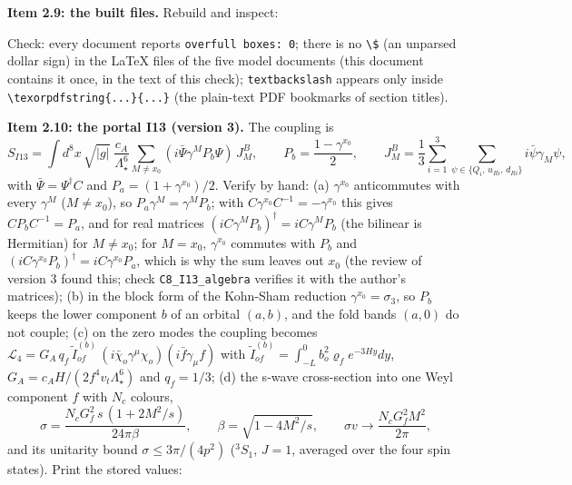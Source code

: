 \documentclass[
  10pt,
]{article}
\newenvironment{Shaded}{}{}
\newcommand{\NormalTok}[1]{#1}
\begin{document}
\textbf{Item 2.9: the built files.} Rebuild and inspect:

\begin{Shaded}
\end{Shaded}

Check: every document reports \texttt{overfull\ boxes:\ 0}; there is no
\texttt{\textbackslash{}\$} (an unparsed dollar sign) in the LaTeX files
of the five model documents (this document contains it once, in the text
of this check); \texttt{textbackslash} appears only inside
\texttt{\textbackslash{}texorpdfstring\{...\}\{...\}} (the plain-text
PDF bookmarks of section titles).

\textbf{Item 2.10: the portal I13 (version 3).} The coupling is
\[ S_{I13} = \int d^8x\,\sqrt{|g|}\;\frac{c_A}{\Lambda_\star^6}\sum_{M \ne x_0}(i\bar\Psi\gamma^MP_b\Psi)\,J^B_M,\qquad P_b = \frac{1 - \gamma^{x_0}}{2},\qquad
   J^B_M = \frac13\sum_{i=1}^{3}\sum_{\psi\in\{Q_i,\,u_{Ri},\,d_{Ri}\}}i\bar\psi\gamma_M\psi, \]
with \(\bar\Psi = \Psi^\dagger C\) and \(P_a = (1 + \gamma^{x_0})/2\).
Verify by hand: (a) \(\gamma^{x_0}\) anticommutes with every
\(\gamma^M\) (\(M \ne x_0\)), so \(P_a\gamma^M = \gamma^MP_b\); with
\(C\gamma^{x_0}C^{-1} = -\gamma^{x_0}\) this gives \(CP_bC^{-1} = P_a\),
and for real matrices \((iC\gamma^MP_b)^\dagger = iC\gamma^MP_b\) (the
bilinear is Hermitian) for \(M \ne x_0\); for \(M = x_0\),
\(\gamma^{x_0}\) commutes with \(P_b\) and
\((iC\gamma^{x_0}P_b)^\dagger = iC\gamma^{x_0}P_a\), which is why the
sum leaves out \(x_0\) (the review of version 3 found this; check
\texttt{C8\_I13\_algebra} verifies it with the author's matrices); (b)
in the block form of the Kohn-Sham reduction
\(\gamma^{x_0} = \sigma_3\), so \(P_b\) keeps the lower component \(b\)
of an orbital \((a, b)\), and the fold bands \((a, 0)\) do not couple;
(c) on the zero modes the coupling becomes
\(\mathcal L_4 = G_A\,q_f\,\tilde I^{(b)}_{of}\,(i\bar\chi_o\gamma^\mu\chi_o)(i\bar f\gamma_\mu f)\)
with \(\tilde I^{(b)}_{of} = \int_{-L}^{0}b_o^2\varrho_fe^{-3Hy}dy\),
\(G_A = c_AH/(2f^4v_t\Lambda_\star^6)\) and \(q_f = 1/3\); (d) the
s-wave cross-section into one Weyl component \(f\) with \(N_c\) colours,
\[ \sigma = \frac{N_cG_f^2\,s\,(1 + 2M^2/s)}{24\pi\beta},\qquad \beta = \sqrt{1 - 4M^2/s},\qquad \sigma v \to \frac{N_cG_f^2M^2}{2\pi}, \]
and its unitarity bound \(\sigma \le 3\pi/(4p^2)\) (\(^3S_1\),
\(J = 1\), averaged over the four spin states). Print the stored values:
\end{document}
